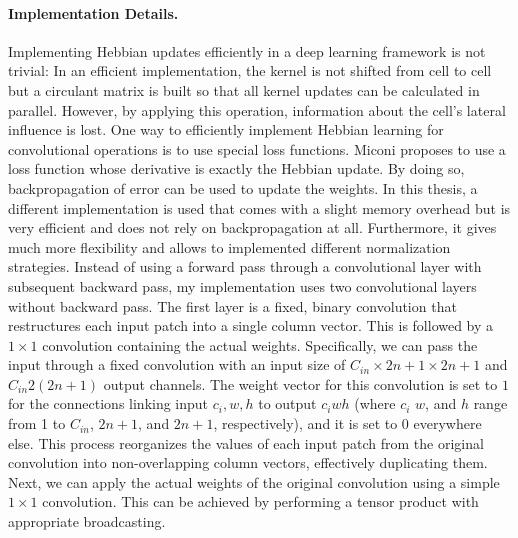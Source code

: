 \paragraph{Implementation Details.} Implementing Hebbian updates efficiently in a deep learning framework is not trivial: In an efficient implementation, the kernel is not shifted from cell to cell but a circulant matrix is built so that all kernel updates can be calculated in parallel. However, by applying this operation, information about the cell's lateral influence is lost. One way to efficiently implement Hebbian learning for convolutional operations is to use special loss functions. Miconi \cite{Miconi_2021} proposes to use a loss function whose derivative is exactly the Hebbian update. By doing so, backpropagation of error can be used to update the weights. In this thesis, a different implementation is used that comes with a slight memory overhead but is very efficient and does not rely on backpropagation at all. Furthermore, it gives much more flexibility and allows to implemented different normalization strategies. Instead of using a forward pass through a convolutional layer with subsequent backward pass, my implementation uses two convolutional layers without backward pass. The first layer is a fixed, binary convolution that restructures each input patch into a single column vector. This is followed by a $1\times1$ convolution containing the actual weights. Specifically, we can pass the input through a fixed convolution with an input size of $C_{in} \times 2n+1 \times 2n+1$ and $C_{in} 2(2n+1)$ output channels. The weight vector for this convolution is set to $1$ for the connections linking input $c_i,w,h$ to output $c_iwh$ (where $c_i$ $w$, and $h$ range from 1 to $C_{in}$, $2n+1$, and $2n+1$, respectively), and it is set to 0 everywhere else. This process reorganizes the values of each input patch from the original convolution into non-overlapping column vectors, effectively duplicating them. Next, we can apply the actual weights of the original convolution using a simple $1\times1$ convolution. This can be achieved by performing a tensor product with appropriate broadcasting.


